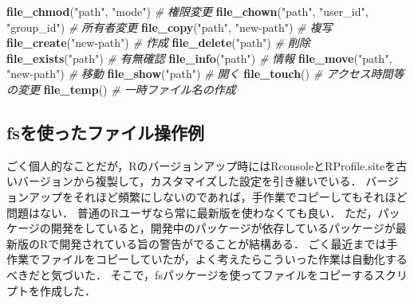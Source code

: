 \documentclass[
]{article}
\newenvironment{Shaded}{\begin{snugshade}}{\end{snugshade}}
\newcommand{\CommentTok}[1]{\textcolor[rgb]{0.56,0.35,0.01}{\textit{#1}}}
\newcommand{\FunctionTok}[1]{\textcolor[rgb]{0.13,0.29,0.53}{\textbf{#1}}}
\newcommand{\NormalTok}[1]{#1}
\newcommand{\StringTok}[1]{\textcolor[rgb]{0.31,0.60,0.02}{#1}}
\begin{document}
\begin{Shaded}
\begin{Highlighting}[]
\FunctionTok{file\_chmod}\NormalTok{(}\StringTok{"path"}\NormalTok{, }\StringTok{"mode"}\NormalTok{)                }\CommentTok{\# 権限変更   }
\FunctionTok{file\_chown}\NormalTok{(}\StringTok{"path"}\NormalTok{, }\StringTok{"user\_id"}\NormalTok{, }\StringTok{"group\_id"}\NormalTok{) }\CommentTok{\# 所有者変更   }
\FunctionTok{file\_copy}\NormalTok{(}\StringTok{"path"}\NormalTok{, }\StringTok{"new{-}path"}\NormalTok{)             }\CommentTok{\# 複写   }
\FunctionTok{file\_create}\NormalTok{(}\StringTok{"new{-}path"}\NormalTok{)                   }\CommentTok{\# 作成   }
\FunctionTok{file\_delete}\NormalTok{(}\StringTok{"path"}\NormalTok{)                       }\CommentTok{\# 削除   }
\FunctionTok{file\_exists}\NormalTok{(}\StringTok{"path"}\NormalTok{)                       }\CommentTok{\# 有無確認   }
\FunctionTok{file\_info}\NormalTok{(}\StringTok{"path"}\NormalTok{)                         }\CommentTok{\# 情報   }
\FunctionTok{file\_move}\NormalTok{(}\StringTok{"path"}\NormalTok{, }\StringTok{"new{-}path"}\NormalTok{)             }\CommentTok{\# 移動   }
\FunctionTok{file\_show}\NormalTok{(}\StringTok{"path"}\NormalTok{)                         }\CommentTok{\# 開く   }
\FunctionTok{file\_touch}\NormalTok{()                              }\CommentTok{\# アクセス時間等の変更   }
\FunctionTok{file\_temp}\NormalTok{()                               }\CommentTok{\# 一時ファイル名の作成   }
\end{Highlighting}
\end{Shaded}

\hypertarget{fsux3092ux4f7fux3063ux305fux30d5ux30a1ux30a4ux30ebux64cdux4f5cux4f8b}{%
\subsection{fsを使ったファイル操作例}\label{fsux3092ux4f7fux3063ux305fux30d5ux30a1ux30a4ux30ebux64cdux4f5cux4f8b}}

ごく個人的なことだが，Rのバージョンアップ時にはRconsoleとRProfile.siteを古いバージョンから複製して，カスタマイズした設定を引き継いでいる．
バージョンアップをそれほど頻繁にしないのであれば，手作業でコピーしてもそれほど問題はない．
普通のRユーザなら常に最新版を使わなくても良い．
ただ，パッケージの開発をしていると，開発中のパッケージが依存しているパッケージが最新版のRで開発されている旨の警告がでることが結構ある．
ごく最近までは手作業でファイルをコピーしていたが，よく考えたらこういった作業は自動化するべきだと気づいた．
そこで，fsパッケージを使ってファイルをコピーするスクリプトを作成した．
\end{document}
